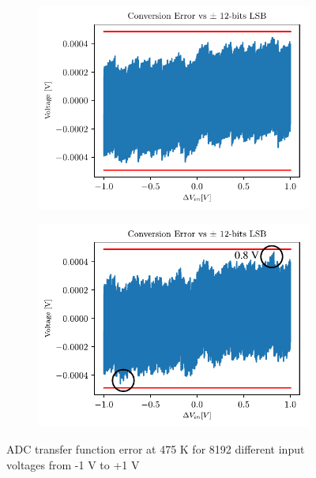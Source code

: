 \begin{figure}[htp]
	\centering
	\begin{subfigure}[b]{0.49\textwidth}
		\centering
		\includegraphics[width=\textwidth]{Chapter4/Figs/results/algo_feedback/adc-error-osr5-fit-fb1-475K.pdf}
	\end{subfigure}
	\begin{subfigure}[b]{0.49\textwidth}
		\centering
		\includegraphics[width=\textwidth]{Chapter4/Figs/results/algo_feedback/adc-error-osr5-fit-fb12-475K.pdf}
	\end{subfigure}
	\caption{ADC transfer function error at 475 K for 8192 different input voltages from -1 V to +1 V}
	\label{fig:algorithmic-feedback-impact-real-475K}
\end{figure}

